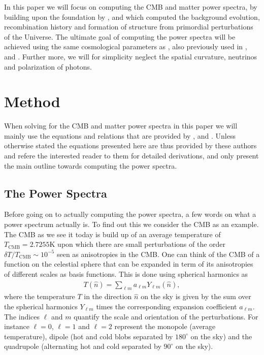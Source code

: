 \documentclass[twocolumn]{aastex62}
\begin{document}
In this paper we will focus on computing the CMB and matter power spectra, by building upon the foundation by \cite{stutzer:2020a}, \cite{stutzer:2020b} and \cite{stutzer:2020c} which computed the background evolution, recombination history and formation of structure from primordial perturbations of the Universe. The ultimate goal of computing the power spectra will be achieved using the same cosmological parameters as \cite{callin:2006}, also previously used in \cite{stutzer:2020a}, \cite{stutzer:2020b} and \cite{stutzer:2020c}. Further more, we will for simplicity neglect the spatial curvature, neutrinos and polarization of photons. 


\section{Method} \label{sec:Method}
When solving for the CMB and matter power spectra in this paper we will mainly use the equations and relations that are provided by \cite{winther:2020c}, \cite{callin:2006} and \cite{dodelson:2003}. Unless otherwise stated the equations presented here are thus provided by these authors and refere the interested reader to them for detailed derivations, and only present the main outline towards computing the power spectra.  


\subsection{The Power Spectra} \label{subsec:spectra}
Before going on to actually computing the power spectra, a few words on what a power spectrum actually is. To find out this we consider the CMB as an example. The CMB as we see it today is build up of an average temperature of $T_\mathrm{CMB} = 2.7255\mathrm{K}$ upon which there are small perturbations of the order $\delta T / T_\mathrm{CMB} \sim 10^{-5}$ seen as anisotropies in the CMB. One can think of the CMB of a function on the celestial sphere that can be expanded in term of its anisotropies of different scales as basis functions. This is done using spherical harmonics as 
\begin{align}
    T(\hat{n}) = \sum_{\ell m} a_{\ell m} Y_{\ell m}(\hat{n}),
\end{align}
where the temperature $T$ in the direction $\hat{n}$ on the sky is given by the sum over the spherical harmonics $Y_{\ell m}$ times the corresponding expansion coefficient $a_{\ell m}$. The indices $\ell$ and $m$ quantify the scale and orientation of the perturbations. For instance $\ell = 0$, $\ell = 1$ and $\ell = 2$ represent the monopole (average temperature), dipole (hot and cold blobs separated by $180^\circ$ on the sky) and the quadrupole (alternating hot and cold separated by $90^\circ$ on the sky).
\end{document}

